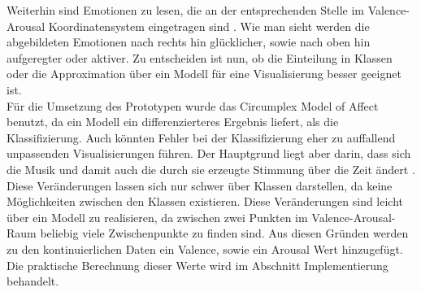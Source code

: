 \documentclass[11pt,a4paper]{article}
\begin{document}
Weiterhin sind Emotionen zu lesen, die an der entsprechenden Stelle im Valence-Arousal Koordinatensystem eingetragen sind \cite[S. 4]{8a02f9c512933d46fbea928d23ac65e38b61b88caba9b38319a5d4952b5a6667} \cite[S. 7]{russell1980circumplex}. Wie man sieht werden die abgebildeten Emotionen nach rechts hin glücklicher, sowie nach oben hin aufgeregter oder aktiver. Zu entscheiden ist nun, ob die Einteilung in Klassen oder die Approximation über ein Modell für eine Visualisierung besser geeignet ist.\\
Für die Umsetzung des Prototypen wurde das Circumplex Model of Affect benutzt, da ein Modell ein differenzierteres Ergebnis liefert, als die Klassifizierung. Auch könnten Fehler bei der Klassifizierung eher zu auffallend unpassenden Visualisierungen führen. Der Hauptgrund liegt aber darin, dass sich die Musik und damit auch die durch sie erzeugte Stimmung über die Zeit ändert \cite{8a02f9c512933d46fbea928d23ac65e38b61b88caba9b38319a5d4952b5a6667}. Diese Veränderungen lassen sich nur schwer über Klassen darstellen, da keine Möglichkeiten zwischen den Klassen existieren. Diese Veränderungen sind leicht über ein Modell zu realisieren, da zwischen zwei Punkten im Valence-Arousal-Raum beliebig viele Zwischenpunkte zu finden sind. Aus diesen Gründen werden zu den kontinuierlichen Daten ein Valence, sowie ein Arousal Wert hinzugefügt. Die praktische Berechnung dieser Werte wird im Abschnitt Implementierung behandelt.
\end{document}
